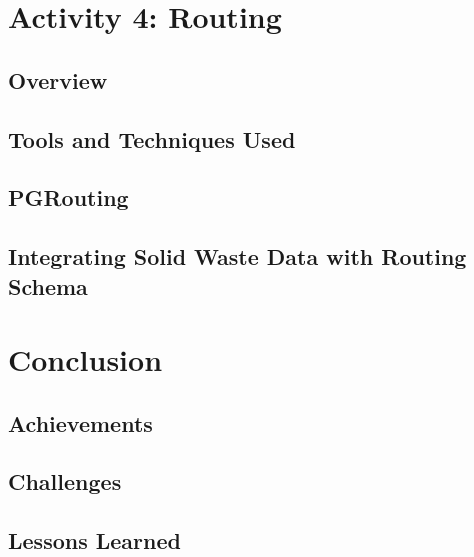 \documentclass[a4paper,12pt,twoside]{article}
\begin{document}
    \begin{multicols}{2}
    \lipsum[0-5]
    \end{multicols}

\section{Activity 4: Routing}

\subsection{Overview}

\subsection{Tools and Techniques Used}

\subsection{PGRouting}

\subsection{Integrating Solid Waste Data with Routing Schema}

\section{Conclusion}

    \begin{multicols}{2}
    \lipsum[0-5]
    \end{multicols}

\subsection{Achievements}

    \begin{multicols}{2}
    \lipsum[0-5]
    \end{multicols}

\subsection{Challenges}

    \begin{multicols}{2}
    \lipsum[0-5]
    \end{multicols}

\subsection{Lessons Learned}
\end{document}
